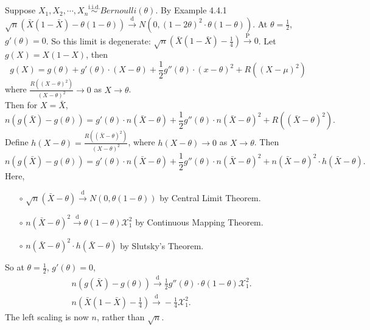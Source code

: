 \documentclass[a4paper]{article}
\begin{document}
\begin{eg}
	Suppose $X_1, X_2, \cdots, X_n \stackrel{\text{i.i.d.}}{\sim} Bernoulli(\theta)$. By Example 4.4.1 $\sqrt{n}(\bar{X}(1-\bar{X})-\theta(1-\theta)) \stackrel{\text{d}}{\longrightarrow} N(0,(1-2\theta)^2 \cdot \theta(1-\theta))$. At $\theta = \frac{1}{2}$, $g'(\theta) = 0$. So this limit is degenerate: $\sqrt{n}\left(\bar{X}(1-\bar{X})-\frac{1}{4}\right) \stackrel{\text{P}}{\longrightarrow} 0$. Let $g(X) = X(1-X)$, then
	\begin{equation*}
		g(X) = g(\theta) + g'(\theta)\cdot(X-\theta)+ \frac{1}{2}g''(\theta) \cdot (x-\theta)^2 + R((X-\mu)^2)
	\end{equation*}
	where $\frac{R((X-\theta)^2)}{(X-\theta)^2} \to 0$ as $X \to \theta$.\\
	\newline
	Then for $X = \bar{X}$,
	\begin{equation}
		n(g(\bar{X}) - g(\theta)) = g'(\theta)\cdot n(\bar{X}-\theta)+ \frac{1}{2}g''(\theta) \cdot n(\bar{X}-\theta)^2 + R((\bar{X}-\theta)^2).
	\end{equation}
	Define $h(X-\theta) = \frac{R((\bar{X}-\theta)^2)}{(X-\theta)^2}$, where $h(X-\theta) \to 0$ as $X \to \theta$. Then
	\begin{equation}
		n(g(\bar{X}) - g(\theta)) = g'(\theta)\cdot n(\bar{X}-\theta)+ \frac{1}{2}g''(\theta) \cdot n(\bar{X}-\theta)^2 + n(\bar{X}-\theta)^2 \cdot h(\bar{X} - \theta).
	\end{equation}
	Here,
	\begin{itemize}
		\item[$\circ$] $\sqrt{n}(\bar{X}-\theta) \stackrel{\text{d}}{\longrightarrow} N(0,\theta(1-\theta))$ by Central Limit Theorem.
		\item[$\circ$] $n(\bar{X}-\theta)^2 \stackrel{\text{d}}{\longrightarrow} \theta(1-\theta) \mathcal{X}_1^2$ by Continuous Mapping Theorem.
		\item[$\circ$] $n(\bar{X}-\theta)^2 \cdot h(\bar{X} - \theta)$ by Slutsky's Theorem. 
	\end{itemize}
	So at $\theta = \frac{1}{2}$, $g'(\theta) = 0$,
	\begin{equation}
		\begin{aligned}
			& n(g(\bar{X}) - g(\theta)) \stackrel{\text{d}}{\longrightarrow} \frac{1}{2}g''(\theta) \cdot \theta(1-\theta) \mathcal{X}_1^2. \\
			& n\left(\bar{X}(1-\bar{X})-\frac{1}{4}\right) \stackrel{\text{d}}{\longrightarrow} -\frac{1}{4} \mathcal{X}_1^2.
		\end{aligned}
	\end{equation}
	The left scaling is now $n$, rather than $\sqrt{n}$.
\end{eg}
\end{document}
